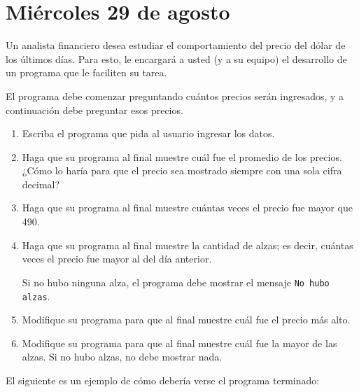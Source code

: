 \documentclass[12pt,spanish]{article}
\begin{document}
  \thispagestyle{empty}
  \section*{Miércoles 29 de agosto}
  Un analista financiero desea estudiar el comportamiento
  del precio del dólar de los últimos días.
  Para esto, le encargará a usted (y a su equipo)
  el desarrollo de un programa que le faciliten su tarea.

  El programa debe comenzar preguntando
  cuántos precios serán ingresados,
  y a continuación debe preguntar esos precios.

  \begin{enumerate}[leftmargin=0pt,start=0]

    \item
      Escriba el programa que pida al usuario ingresar los datos.

    \item
      Haga que su programa al final muestre
      cuál fue el promedio de los precios.
      ¿Cómo lo haría para que el precio sea mostrado
      siempre con una sola cifra decimal?

    \item
      Haga que su programa al final muestre
      cuántas veces el precio fue mayor que 490.

    \item
      Haga que su programa al final muestre
      la cantidad de alzas;
      es decir, cuántas veces el precio fue mayor
      al del día anterior.

      Si no hubo ninguna alza,
      el programa debe mostrar el mensaje
      \texttt{No hubo alzas}.

    \item
      Modifique su programa para que al final muestre
      cuál fue el precio más alto.

    \item
      Modifique su programa para que al final muestre
      cuál fue la mayor de las alzas.
      Si no hubo alzas, no debe mostrar nada.

  \end{enumerate}

  El siguiente es un ejemplo de cómo debería verse el programa terminado:

  \begin{minipage}[t]{0.6\textwidth}
    
  \end{minipage}
\end{document}
